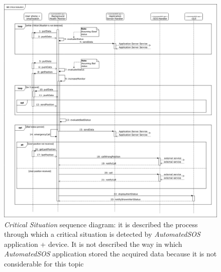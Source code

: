 \begin{figure}[H]
  \begin{center}
  	\includegraphics[width=\textwidth]{./img/sequence/criticalSituation.png}
    \hspace{0.05\linewidth}
    \centering
    \caption{\textit{Critical Situation} sequence diagram: it is described the process through which a critical situation is detected by \textit{AutomatedSOS} application + device. It is not described the way in which \textit{AutomatedSOS} application stored the acquired data because it is not considerable for this topic}
		\label{img:criticalSituation}
    \end{center}
\end{figure}

